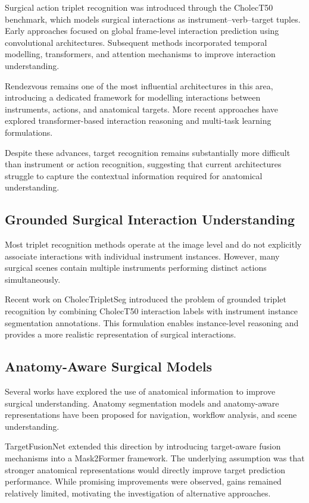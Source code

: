 \documentclass[11pt]{article}
\begin{document}
Surgical action triplet recognition was introduced through the CholecT50 benchmark, which models surgical interactions as instrument--verb--target tuples. Early approaches focused on global frame-level interaction prediction using convolutional architectures. Subsequent methods incorporated temporal modelling, transformers, and attention mechanisms to improve interaction understanding.

Rendezvous remains one of the most influential architectures in this area, introducing a dedicated framework for modelling interactions between instruments, actions, and anatomical targets. More recent approaches have explored transformer-based interaction reasoning and multi-task learning formulations.

Despite these advances, target recognition remains substantially more difficult than instrument or action recognition, suggesting that current architectures struggle to capture the contextual information required for anatomical understanding.

\subsection{Grounded Surgical Interaction Understanding}

Most triplet recognition methods operate at the image level and do not explicitly associate interactions with individual instrument instances. However, many surgical scenes contain multiple instruments performing distinct actions simultaneously.

Recent work on CholecTripletSeg introduced the problem of grounded triplet recognition by combining CholecT50 interaction labels with instrument instance segmentation annotations. This formulation enables instance-level reasoning and provides a more realistic representation of surgical interactions.

\subsection{Anatomy-Aware Surgical Models}

Several works have explored the use of anatomical information to improve surgical understanding. Anatomy segmentation models and anatomy-aware representations have been proposed for navigation, workflow analysis, and scene understanding.

TargetFusionNet extended this direction by introducing target-aware fusion mechanisms into a Mask2Former framework. The underlying assumption was that stronger anatomical representations would directly improve target prediction performance. While promising improvements were observed, gains remained relatively limited, motivating the investigation of alternative approaches.
\end{document}
